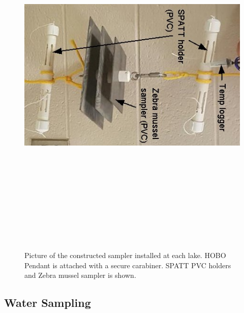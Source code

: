 \begin{figure}[!h]
\centering
\includegraphics[width=\textwidth, height=18cm]{figures/samplers}
\caption{Picture of the constructed sampler installed at each lake. HOBO Pendant is attached with a secure carabiner. SPATT PVC holders and Zebra mussel sampler is shown.}
\label{fig:samplerr}
\end{figure}

\subsection{Water Sampling} \label{sampling}

